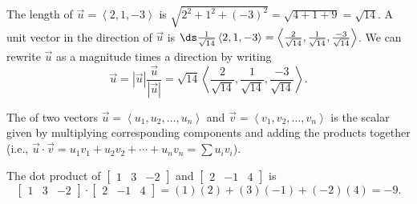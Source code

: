 \begin{example}
The length of $\vec u=\left<2,1,-3\right>$ is $\sqrt{2^2+1^2+(-3)^2} = \sqrt{4+1+9}=\sqrt{14}$.  
A unit vector in the direction of $\vec u$ is 
$\ds\frac{1}{\sqrt{14}}\left<2,1,-3\right> = \left<\frac{2}{\sqrt{14}},\frac{1}{\sqrt{14}},\frac{-3}{\sqrt{14}}\right>$. 
We can rewrite $\vec u$ as a magnitude times a direction by writing 
$$\vec u = |\vec u| \frac{\vec u}{|\vec u|} = \sqrt{14} \left<\frac{2}{\sqrt{14}},\frac{1}{\sqrt{14}},\frac{-3}{\sqrt{14}}\right>.$$ 
\end{example}


The  of two vectors $\vec u = \left<u_1,u_2,\ldots,u_n\right>$ and $\vec v =\left<v_1,v_2,\ldots,v_n\right>$ is the scalar given by multiplying corresponding components and adding the products together (i.e., $\vec u\cdot \vec v = u_1v_1+u_2v_2+\cdots+u_nv_n = \sum u_iv_i$).
\begin{example} \label{ex dot product}
The dot product of $\begin{bmatrix}1&3&-2\end{bmatrix}$ and $\begin{bmatrix}2&-1&4\end{bmatrix}$ is
 $$\begin{bmatrix}1&3&-2\end{bmatrix}\cdot \begin{bmatrix}2&-1&4\end{bmatrix} = (1)(2)+(3)(-1)+(-2)(4)=-9.$$ 
\end{example}

